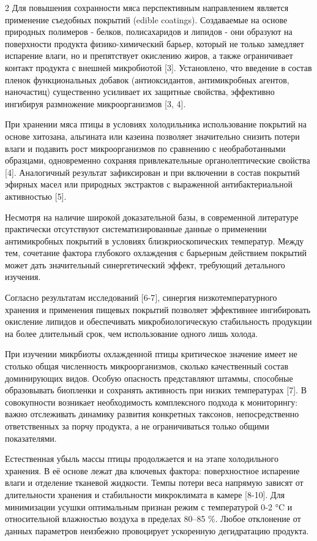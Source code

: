 \begin{multicols}{2}
Для повышения сохранности мяса перспективным направлением является
применение съедобных покрытий (edible coatings). Создаваемые на основе
природных полимеров - белков, полисахаридов и липидов - они образуют на
поверхности продукта физико-химический барьер, который не только
замедляет испарение влаги, но и препятствует окислению жиров, а также
ограничивает контакт продукта с внешней микробиотой {[}3{]}.
Установлено, что введение в состав пленок функциональных добавок
(антиоксидантов, антимикробных агентов, наночастиц) существенно
усиливает их защитные свойства, эффективно ингибируя размножение
микроорганизмов {[}3, 4{]}.

При хранении мяса птицы в условиях холодильника использование покрытий
на основе хитозана, альгината или казеина позволяет значительно снизить
потери влаги и подавить рост микроорганизмов по сравнению с
необработанными образцами, одновременно сохраняя привлекательные
органолептические свойства {[}4{]}. Аналогичный результат зафиксирован и
при включении в состав покрытий эфирных масел или природных экстрактов с
выраженной антибактериальной активностью {[}5{]}.

Несмотря на наличие широкой доказательной базы, в современной литературе
практически отсутствуют систематизированные данные о применении
антимикробных покрытий в условиях близкриоскопических температур. Между
тем, сочетание фактора глубокого охлаждения с барьерным действием
покрытий может дать значительный синергетический эффект, требующий
детального изучения.

Согласно результатам исследований {[}6-7{]}, синергия
низкотемпературного хранения и применения пищевых покрытий позволяет
эффективнее ингибировать окисление липидов и обеспечивать
микробиологическую стабильность продукции на более длительный срок, чем
использование одного лишь холода.

При изучении микрбиоты охлажденной птицы критическое значение имеет не
столько общая численность микроорганизмов, сколько качественный состав
доминирующих видов. Особую опасность представляют штаммы, способные
образовывать биопленки и сохранять активность при низких температурах
{[}7{]}. В совокупности возникает необходимость комплексного подхода к
мониторингу: важно отслеживать динамику развития конкретных таксонов,
непосредственно ответственных за порчу продукта, а не ограничиваться
только общими показателями.

Естественная убыль массы птицы продолжается и на этапе холодильного
хранения. В её основе лежат два ключевых фактора: поверхностное
испарение влаги и отделение тканевой жидкости. Темпы потери веса
напрямую зависят от длительности хранения и стабильности микроклимата в
камере {[}8-10{]}. Для минимизации усушки оптимальным признан режим с
температурой 0-2 °C и относительной влажностью воздуха в пределах 80--85
\%. Любое отклонение от данных параметров неизбежно провоцирует
ускоренную дегидратацию продукта.


\end{multicols}
